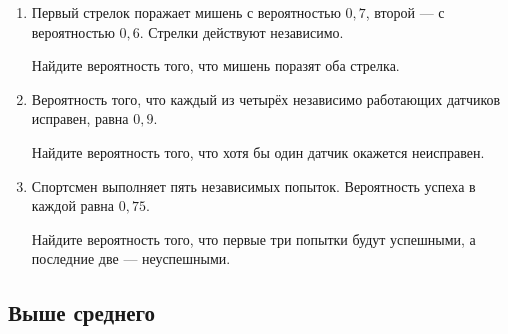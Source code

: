 \documentclass[a4paper,12pt]{article}
\begin{document}
\begin{enumerate}

\item
Первый стрелок поражает мишень с вероятностью $0,7$, второй --- с
вероятностью $0,6$. Стрелки действуют независимо.

Найдите вероятность того, что мишень поразят оба стрелка.

\item
Вероятность того, что каждый из четырёх независимо работающих датчиков
исправен, равна $0,9$.

Найдите вероятность того, что хотя бы один датчик окажется неисправен.

\item
Спортсмен выполняет пять независимых попыток. Вероятность успеха в каждой
равна $0,75$.

Найдите вероятность того, что первые три попытки будут успешными, а
последние две --- неуспешными.

\end{enumerate}

\subsection*{\color{darkaccent}Выше среднего}
\end{document}
